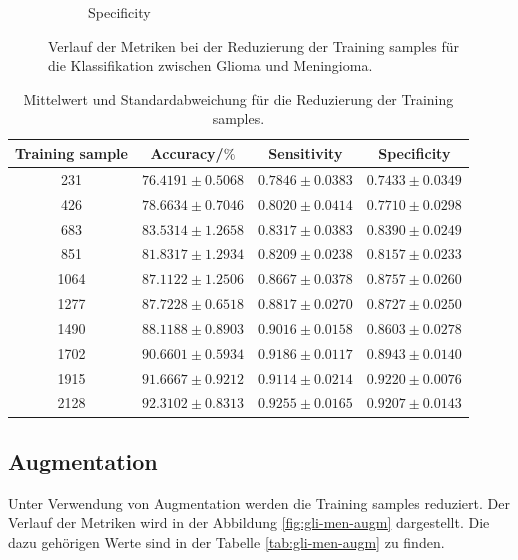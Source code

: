 \begin{figure}[H]
\begin{subfigure}[b]{0.48\textwidth}
    \caption{Specificity}
    \label{fig:gli-men-spec}
  \end{subfigure}
  \caption{Verlauf der Metriken bei der Reduzierung der Training samples für die Klassifikation zwischen Glioma und Meningioma.}
  \label{fig:gli-men-reduktion}
\end{figure}
\begin{table}[H]
    \centering
    {\small
        \begin{tabular}{cccc}
            \toprule
            Training sample & Accuracy/$\%$ & Sensitivity & Specificity\\
            \midrule
            231  & $76.4191 \pm 0.5068$ & $0.7846 \pm 0.0383$ & $0.7433 \pm 0.0349$\\
            426  & $78.6634 \pm 0.7046$ & $0.8020 \pm 0.0414$ & $0.7710 \pm 0.0298$\\
            683  & $83.5314 \pm 1.2658$ & $0.8317 \pm 0.0383$ & $0.8390 \pm 0.0249$\\
            851  & $81.8317 \pm 1.2934$ & $0.8209 \pm 0.0238$ & $0.8157 \pm 0.0233$\\
            1064 & $87.1122 \pm 1.2506$ & $0.8667 \pm 0.0378$ & $0.8757 \pm 0.0260$\\
            1277 & $87.7228 \pm 0.6518$ & $0.8817 \pm 0.0270$ & $0.8727 \pm 0.0250$\\
            1490 & $88.1188 \pm 0.8903$ & $0.9016 \pm 0.0158$ & $0.8603 \pm 0.0278$\\
            1702 & $90.6601 \pm 0.5934$ & $0.9186 \pm 0.0117$ & $0.8943 \pm 0.0140$\\
            1915 & $91.6667 \pm 0.9212$ & $0.9114 \pm 0.0214$ & $0.9220 \pm 0.0076$\\
            2128 & $92.3102 \pm 0.8313$ & $0.9255 \pm 0.0165$ & $0.9207 \pm 0.0143$\\            
            \bottomrule
        \end{tabular}}
  \caption{Mittelwert und Standardabweichung für die Reduzierung der Training samples.}
  \label{tab:Red-gli-men}
\end{table}

\subsection{Augmentation}
Unter Verwendung von Augmentation werden die Training samples reduziert.
Der Verlauf der Metriken wird in der Abbildung \ref{fig:gli-men-augm} dargestellt.
Die dazu gehörigen Werte sind in der Tabelle \ref{tab:gli-men-augm} zu finden.

